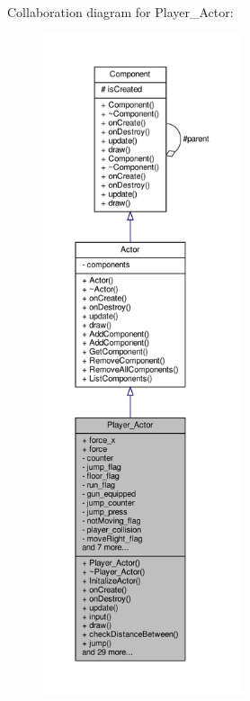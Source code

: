 Collaboration diagram for Player\+\_\+\+Actor\+:
\nopagebreak
\begin{figure}[H]
\begin{center}
\leavevmode
\includegraphics[height=550pt]{classPlayer__Actor__coll__graph}
\end{center}
\end{figure}
